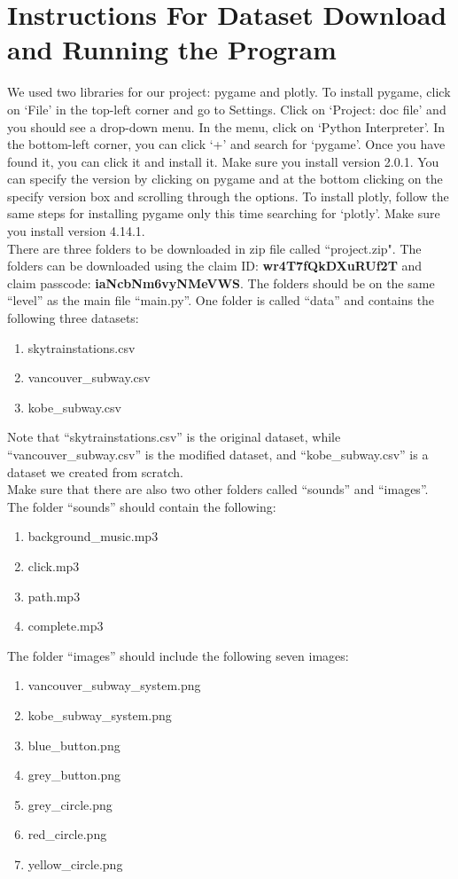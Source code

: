 \documentclass[fontsize=11pt]{article}
\begin{document}
\section*{Instructions For Dataset Download and Running the Program}

We used two libraries for our project: pygame and plotly.
To install pygame, click on `File’ in the top-left corner and go to Settings.  Click on `Project:  doc file’ and you should see a drop-down menu.  In the menu, click on `Python Interpreter’.  In the bottom-left corner, you can click `+’ and search for `pygame’. Once you have found it, you can click it and install it. Make sure you install version 2.0.1. You can specify the version by clicking on pygame and at the bottom clicking on the specify version box and scrolling through the options.
To install plotly, follow the same steps for installing pygame only this time searching for ‘plotly’. Make sure you install version 4.14.1. \\

There are three folders to be downloaded in zip file called ``project.zip". The folders can be downloaded using the claim ID: \textbf{wr4T7fQkDXuRUf2T} and claim passcode: \textbf{iaNcbNm6vyNMeVWS}. The folders should be on the same ``level” as the main file ``main.py”. One folder is called ``data” and contains the following three datasets:
\begin{enumerate}[noitemsep]
    \item skytrainstations.csv
    \item vancouver\_subway.csv
    \item kobe\_subway.csv
\end{enumerate}
Note that ``skytrainstations.csv” is the original dataset, while ``vancouver\_subway.csv” is the modified dataset, and “kobe\_subway.csv” is a dataset we created from scratch. \\

Make sure that there are also two other folders called ``sounds” and ``images”. The folder ``sounds” should contain the following:
\begin{enumerate}[noitemsep]
    \item background\_music.mp3
    \item click.mp3
    \item path.mp3
    \item complete.mp3
\end{enumerate}

\medskip

\noindent The folder ``images” should include the following seven images: 
\begin{enumerate}[noitemsep]
    \item vancouver\_subway\_system.png
    \item kobe\_subway\_system.png
    \item blue\_button.png
    \item grey\_button.png
    \item grey\_circle.png
    \item red\_circle.png
    \item yellow\_circle.png
\end{enumerate}
\end{document}
